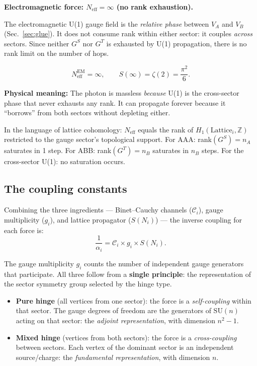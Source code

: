 \bigskip

\noindent\textbf{Electromagnetic force: $N_\text{eff} = \infty$ (no rank exhaustion).}

The electromagnetic U(1) gauge field is the \emph{relative phase} between $V_A$ and $V_B$ (Sec.~\ref{sec:glue}). It does not consume rank within either sector: it couples \emph{across} sectors. Since neither $G^S$ nor $G^T$ is exhausted by U(1) propagation, there is no rank limit on the number of hops.

\begin{equation}
N_\text{eff}^\text{EM} = \infty, \qquad S(\infty) = \zeta(2) = \frac{\pi^2}{6}.
\end{equation}

\textbf{Physical meaning:} The photon is massless \emph{because} U(1) is the cross-sector phase that never exhausts any rank. It can propagate forever because it ``borrows'' from both sectors without depleting either.

\bigskip

\begin{remark}
In the language of lattice cohomology: $N_\text{eff}$ equals the rank of $H_1(\text{Lattice}_i, \mathbb{Z})$ restricted to the gauge sector's topological support. For AAA: rank$(G^S) = n_A$ saturates in 1 step. For ABB: rank$(G^T) = n_B$ saturates in $n_B$ steps. For the cross-sector U(1): no saturation occurs.
\end{remark}

\subsection{The coupling constants}

Combining the three ingredients --- Binet--Cauchy channels ($\mathcal{C}_i$), gauge multiplicity ($g_i$), and lattice propagator ($S(N_i)$) --- the inverse coupling for each force is:
\begin{equation}
\frac{1}{\alpha_i} = \mathcal{C}_i \times g_i \times S(N_i).
\end{equation}

The gauge multiplicity $g_i$ counts the number of independent gauge generators that participate. All three follow from a \textbf{single principle}: the representation of the sector symmetry group selected by the hinge type.

\begin{itemize}
\item \textbf{Pure hinge} (all vertices from one sector): the force is a \emph{self-coupling} within that sector. The gauge degrees of freedom are the generators of $\text{SU}(n)$ acting on that sector: the \emph{adjoint representation}, with dimension $n^2 - 1$.

\item \textbf{Mixed hinge} (vertices from both sectors): the force is a \emph{cross-coupling} between sectors. Each vertex of the dominant sector is an independent source/charge: the \emph{fundamental representation}, with dimension $n$.
\end{itemize}

